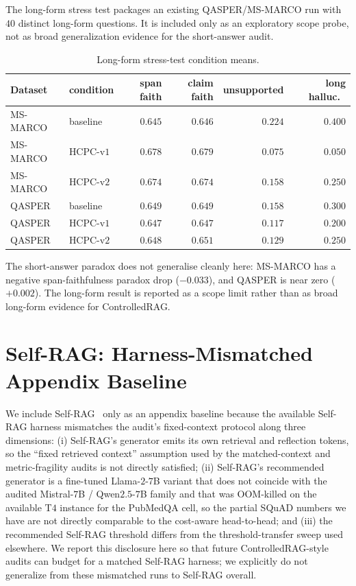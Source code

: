 The long-form stress test packages an existing QASPER/MS-MARCO run
with $40$ distinct long-form questions. It is included only as an
exploratory scope probe, not as broad generalization evidence for the
short-answer audit.

\begin{table}[!htb]
\centering
\caption{Long-form stress-test condition means.}
\footnotesize
\begin{tabular}{llrrrr}
\toprule
Dataset & condition & span faith & claim faith & unsupported & long halluc.\ \\
\midrule
MS-MARCO & baseline   & $0.645$ & $0.646$ & $0.224$ & $0.400$ \\
MS-MARCO & HCPC-v$1$  & $0.678$ & $0.679$ & $0.075$ & $0.050$ \\
MS-MARCO & HCPC-v$2$  & $0.674$ & $0.674$ & $0.158$ & $0.250$ \\
QASPER   & baseline   & $0.649$ & $0.649$ & $0.158$ & $0.300$ \\
QASPER   & HCPC-v$1$  & $0.647$ & $0.647$ & $0.117$ & $0.200$ \\
QASPER   & HCPC-v$2$  & $0.648$ & $0.651$ & $0.129$ & $0.250$ \\
\bottomrule
\end{tabular}
\end{table}

The short-answer paradox does not generalise cleanly here: MS-MARCO has
a negative span-faithfulness paradox drop ($-0.033$), and QASPER is
near zero ($+0.002$). The long-form result is reported as a scope
limit rather than as broad long-form evidence for ControlledRAG.

\section{Self-RAG: Harness-Mismatched Appendix Baseline}
\label{app:self_rag}

We include Self-RAG~\citep{asai2024selfrag} only as an appendix
baseline because the available Self-RAG harness mismatches the audit's
fixed-context protocol along three dimensions: (i) Self-RAG's
generator emits its own retrieval and reflection tokens, so the
``fixed retrieved context'' assumption used by the matched-context and
metric-fragility audits is not directly satisfied; (ii) Self-RAG's
recommended generator is a fine-tuned Llama-$2$-$7$B variant that does
not coincide with the audited Mistral-$7$B / Qwen$2.5$-$7$B family
and that was OOM-killed on the available T$4$ instance for the
PubMedQA cell, so the partial SQuAD numbers we have are not directly
comparable to the cost-aware head-to-head; and (iii) the
recommended Self-RAG threshold differs from the threshold-transfer
sweep used elsewhere. We report this disclosure here so that future
ControlledRAG-style audits can budget for a matched Self-RAG harness;
we explicitly do not generalize from these mismatched runs to Self-RAG
overall.

